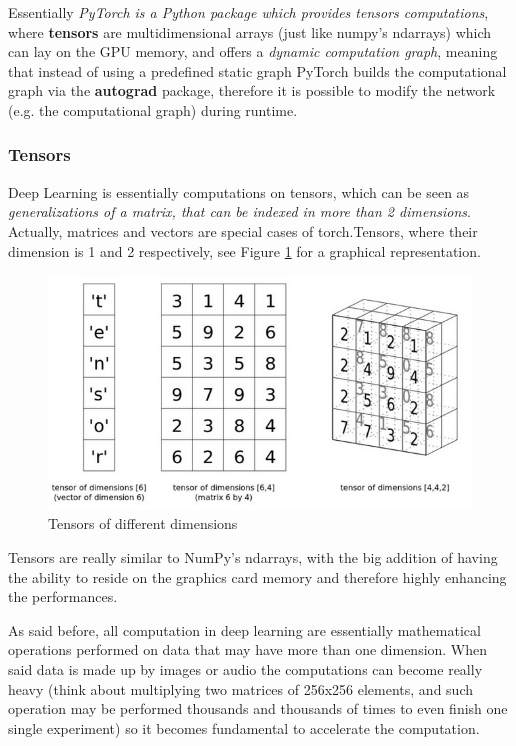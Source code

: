 \documentclass[11pt,a4paper,titlepage]{book}
\begin{document}
Essentially \textit{PyTorch is a Python package which provides tensors computations}, where \textbf{tensors} are multidimensional arrays (just like numpy's ndarrays) which can lay on the GPU memory, and offers a \textit{dynamic computation graph}, meaning that instead of using a predefined static graph PyTorch builds the computational graph via the \textbf{autograd} package, therefore it is possible to modify the network (e.g. the computational graph) during runtime.

\subsubsection{Tensors}
Deep Learning is essentially computations on tensors, which can be seen as \textit{generalizations of a matrix, that can be indexed in more than 2 dimensions}. Actually, matrices and vectors are special cases of torch.Tensors, where their dimension is 1 and 2 respectively, see Figure \ref{pytorch_tensor} for a graphical representation.
\begin{figure}[ht]
    \centering
    \includegraphics[width=\textwidth]{imgs/ch_3/pytorch_tensor.png}
    \caption{Tensors of different dimensions} 
    \label{pytorch_tensor}
\end{figure}
\newline
\newline
Tensors are really similar to NumPy's ndarrays, with the big addition of having the ability to reside on the graphics card memory and therefore highly enhancing the performances.

As said before, all computation in deep learning are essentially mathematical operations performed on data that may have more than one dimension. When said data is made up by images or audio the computations can become really heavy (think about multiplying two matrices of 256x256 elements, and such operation may be performed thousands and thousands of times to even finish one single experiment) so it becomes fundamental to accelerate the computation.
\end{document}
